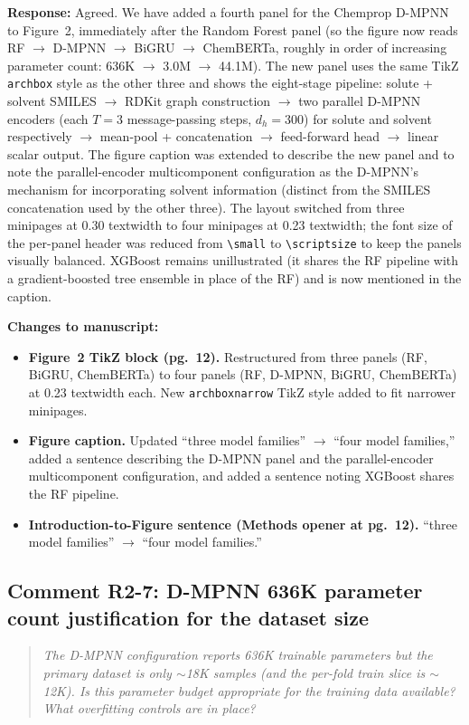 \documentclass[11pt]{article}
\newenvironment{reviewer}{%
  \begin{quote}\itshape\color{black!70}}{%
  \end{quote}}
\newcommand{\response}[1]{\noindent\textbf{Response:} #1\par\medskip}
\newenvironment{changes}{%
  \noindent\textbf{Changes to manuscript:}
  \begin{itemize}[leftmargin=2em,itemsep=2pt]}{%
  \end{itemize}\medskip}
\begin{document}
\response{Agreed. We have added a fourth panel for the Chemprop D-MPNN to Figure~2, immediately after the Random Forest panel (so the figure now reads RF $\to$ D-MPNN $\to$ BiGRU $\to$ ChemBERTa, roughly in order of increasing parameter count: 636K $\to$ 3.0M $\to$ 44.1M). The new panel uses the same TikZ \texttt{archbox} style as the other three and shows the eight-stage pipeline: solute + solvent SMILES $\to$ RDKit graph construction $\to$ two parallel D-MPNN encoders (each $T = 3$ message-passing steps, $d_h = 300$) for solute and solvent respectively $\to$ mean-pool + concatenation $\to$ feed-forward head $\to$ linear scalar output. The figure caption was extended to describe the new panel and to note the parallel-encoder multicomponent configuration as the D-MPNN's mechanism for incorporating solvent information (distinct from the SMILES concatenation used by the other three). The layout switched from three minipages at 0.30 textwidth to four minipages at 0.23 textwidth; the font size of the per-panel header was reduced from \texttt{\textbackslash small} to \texttt{\textbackslash scriptsize} to keep the panels visually balanced. XGBoost remains unillustrated (it shares the RF pipeline with a gradient-boosted tree ensemble in place of the RF) and is now mentioned in the caption.}

\begin{changes}
  \item \textbf{Figure~2 TikZ block (pg.\ 12).} Restructured from three panels (RF, BiGRU, ChemBERTa) to four panels (RF, D-MPNN, BiGRU, ChemBERTa) at 0.23 textwidth each. New \texttt{archboxnarrow} TikZ style added to fit narrower minipages.
  \item \textbf{Figure caption.} Updated ``three model families'' $\to$ ``four model families,'' added a sentence describing the D-MPNN panel and the parallel-encoder multicomponent configuration, and added a sentence noting XGBoost shares the RF pipeline.
  \item \textbf{Introduction-to-Figure sentence (Methods opener at pg.\ 12).} ``three model families'' $\to$ ``four model families.''
\end{changes}

\subsection*{Comment R2-7: D-MPNN 636K parameter count justification for the dataset size}
\begin{reviewer}
The D-MPNN configuration reports 636K trainable parameters but the primary dataset is only $\sim$18K samples (and the per-fold train slice is $\sim$12K). Is this parameter budget appropriate for the training data available? What overfitting controls are in place?
\end{reviewer}
\end{document}
